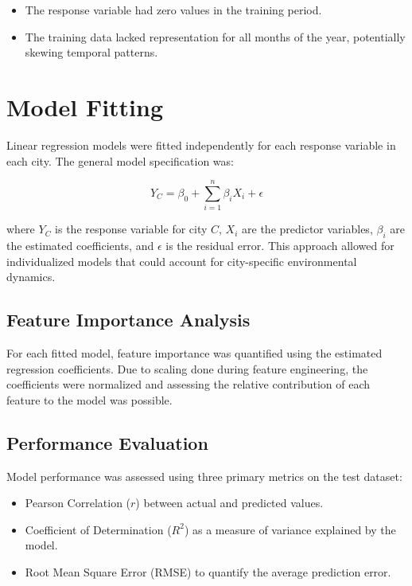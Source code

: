 \documentclass[twoside,11pt]{article}
\begin{document}
\begin{itemize}
  \item The response variable had zero values in the training period.
  \item The training data lacked representation for all months of the year, potentially skewing temporal patterns.
\end{itemize}

\section{Model Fitting}

Linear regression models were fitted independently for each response variable in each city. The general model specification was:

\[
Y_{C} = \beta_{0} + \sum_{i=1}^{n} \beta_{i} X_{i} + \epsilon
\]

where $Y_{C}$ is the response variable for city $C$, $X_{i}$ are the predictor variables, $\beta_{i}$ are the estimated coefficients, and $\epsilon$ is the residual error. This approach allowed for individualized models that could account for city-specific environmental dynamics.

\subsection{Feature Importance Analysis}

For each fitted model, feature importance was quantified using the estimated regression coefficients. Due to scaling done during feature engineering, the coefficients were normalized and assessing the relative contribution of each feature to the model was possible.

\subsection{Performance Evaluation}

Model performance was assessed using three primary metrics on the test dataset:

\begin{itemize}
  \item Pearson Correlation ($r$) between actual and predicted values.
  \item Coefficient of Determination ($R^2$) as a measure of variance explained by the model.
  \item Root Mean Square Error (RMSE) to quantify the average prediction error.
\end{itemize}
\end{document}
